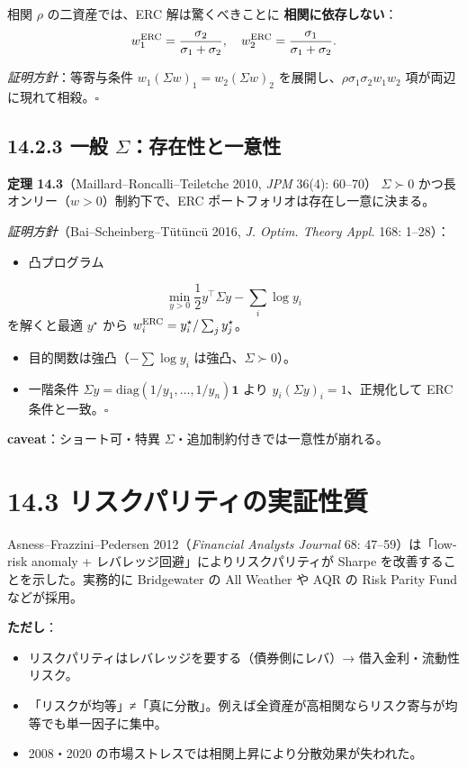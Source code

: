 \documentclass[11pt,a4paper]{report}
\begin{document}
相関 $\rho$ の二資産では、ERC 解は驚くべきことに \textbf{相関に依存しない}： \[ w_1^{\rm ERC} = \frac{\sigma_2}{\sigma_1 + \sigma_2}, \quad w_2^{\rm ERC} = \frac{\sigma_1}{\sigma_1 + \sigma_2}. \]

\emph{証明方針}：等寄与条件 $w_1 (\Sigma w)_1 = w_2 (\Sigma w)_2$ を展開し、$\rho \sigma_1 \sigma_2 w_1 w_2$ 項が両辺に現れて相殺。$\square$

\subsection{14.2.3 一般 $\Sigma$：存在性と一意性}

\textbf{定理 14.3}（Maillard–Roncalli–Teiletche 2010, \emph{JPM} 36(4): 60–70） $\Sigma \succ 0$ かつ長オンリー（$w > 0$）制約下で、ERC ポートフォリオは存在し一意に決まる。

\emph{証明方針}（Bai–Scheinberg–Tütüncü 2016, \emph{J. Optim. Theory Appl.} 168: 1–28）：
\begin{itemize}
\item 凸プログラム
\end{itemize}
\[ \min_{y > 0} \frac{1}{2} y^\top \Sigma y - \sum_i \log y_i \] を解くと最適 $y^\star$ から $w_i^{\rm ERC} = y_i^\star / \sum_j y_j^\star$。
\begin{itemize}
\item 目的関数は強凸（$-\sum \log y_i$ は強凸、$\Sigma \succ 0$）。
\item 一階条件 $\Sigma y = \mathrm{diag}(1/y_1, \dots, 1/y_n) \mathbf{1}$ より $y_i (\Sigma y)_i = 1$、正規化して ERC 条件と一致。$\square$
\end{itemize}

\textbf{caveat}：ショート可・特異 $\Sigma$・追加制約付きでは一意性が崩れる。

\section{14.3 リスクパリティの実証性質}

Asness–Frazzini–Pedersen 2012（\emph{Financial Analysts Journal} 68: 47–59）は「low-risk anomaly + レバレッジ回避」によりリスクパリティが Sharpe を改善することを示した。実務的に Bridgewater の All Weather や AQR の Risk Parity Fund などが採用。

\textbf{ただし}：
\begin{itemize}
\item リスクパリティはレバレッジを要する（債券側にレバ）→ 借入金利・流動性リスク。
\item 「リスクが均等」≠「真に分散」。例えば全資産が高相関ならリスク寄与が均等でも単一因子に集中。
\item 2008・2020 の市場ストレスでは相関上昇により分散効果が失われた。
\end{itemize}
\end{document}
